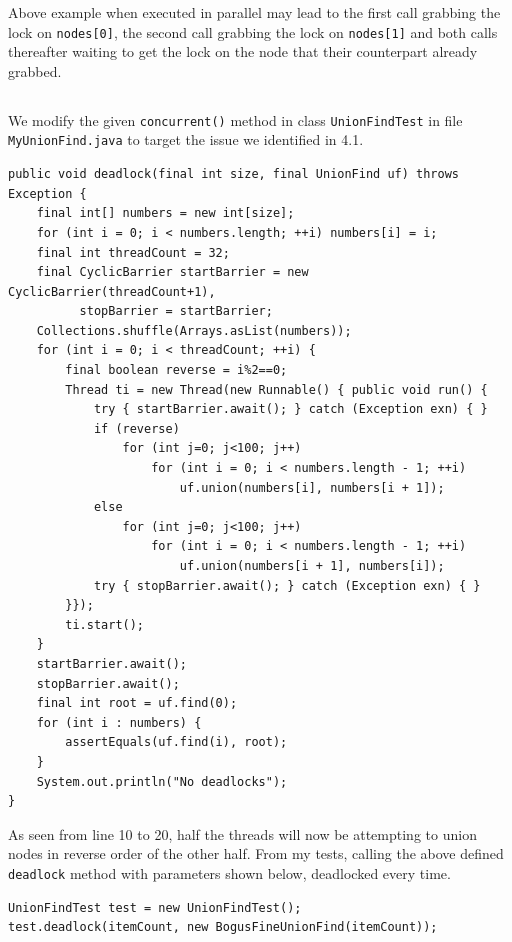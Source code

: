 \documentclass[a5paper]{article}
\begin{document}
Above example when executed in parallel may lead to the first call grabbing the lock on \texttt{nodes[0]}, the second call grabbing the lock on \texttt{nodes[1]} and both calls thereafter waiting to get the lock on the node that their counterpart already grabbed.

\subsection{}
We modify the given \texttt{concurrent()} method in class \texttt{UnionFindTest} in file \texttt{MyUnionFind.java} to target the issue we identified in 4.1.
\begin{lstlisting}
public void deadlock(final int size, final UnionFind uf) throws Exception {
    final int[] numbers = new int[size];
    for (int i = 0; i < numbers.length; ++i) numbers[i] = i;
    final int threadCount = 32;
    final CyclicBarrier startBarrier = new CyclicBarrier(threadCount+1), 
          stopBarrier = startBarrier;
    Collections.shuffle(Arrays.asList(numbers));
    for (int i = 0; i < threadCount; ++i) {
        final boolean reverse = i%2==0;
        Thread ti = new Thread(new Runnable() { public void run() {
            try { startBarrier.await(); } catch (Exception exn) { }
            if (reverse)
                for (int j=0; j<100; j++)
                    for (int i = 0; i < numbers.length - 1; ++i) 
                        uf.union(numbers[i], numbers[i + 1]);
            else 
                for (int j=0; j<100; j++)
                    for (int i = 0; i < numbers.length - 1; ++i) 
                        uf.union(numbers[i + 1], numbers[i]);
            try { stopBarrier.await(); } catch (Exception exn) { }
        }});
        ti.start();
    }
    startBarrier.await();
    stopBarrier.await();
    final int root = uf.find(0);
    for (int i : numbers) {
        assertEquals(uf.find(i), root);
    }
    System.out.println("No deadlocks");
}
\end{lstlisting}

As seen from line 10 to 20, half the threads will now be attempting to union nodes in reverse order of the other half.
From my tests, calling the above defined \texttt{deadlock} method with parameters shown below, deadlocked every time.

\begin{lstlisting}
UnionFindTest test = new UnionFindTest();
test.deadlock(itemCount, new BogusFineUnionFind(itemCount));
\end{lstlisting}
\end{document}
